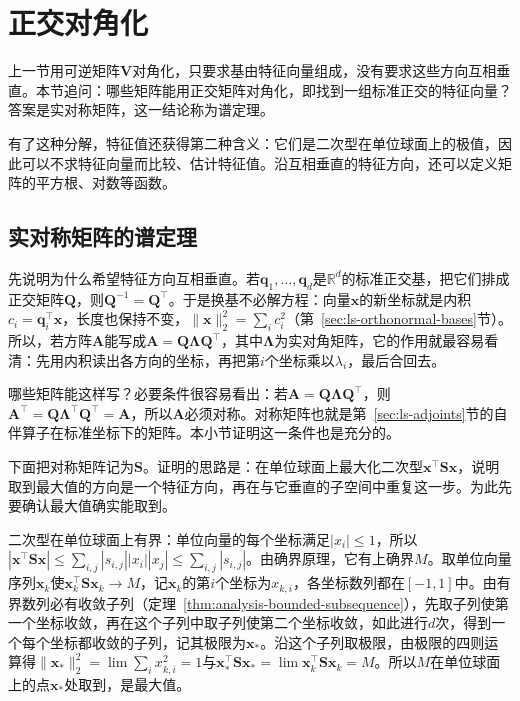 
\section{正交对角化}
\label{sec:ls-spectral-theory}

上一节用可逆矩阵$\bm V$对角化，只要求基由特征向量组成，没有要求这些方向互相垂直。本节追问：哪些矩阵能用正交矩阵对角化，即找到一组标准正交的特征向量？答案是实对称矩阵，这一结论称为谱定理。

有了这种分解，特征值还获得第二种含义：它们是二次型在单位球面上的极值，因此可以不求特征向量而比较、估计特征值。沿互相垂直的特征方向，还可以定义矩阵的平方根、对数等函数。

\subsection{实对称矩阵的谱定理}
\label{sec:ls-symmetric-spectral-decomposition}

先说明为什么希望特征方向互相垂直。若$\bm q_1,\ldots,\bm q_d$是$\mathbb R^d$的标准正交基，把它们排成正交矩阵$\bm Q$，则$\bm Q^{-1}=\bm Q^\top$。于是换基不必解方程：向量$\bm x$的新坐标就是内积$c_i=\bm q_i^\top\bm x$，长度也保持不变，$\lVert\bm x\rVert_2^2=\sum_ic_i^2$（第~\ref{sec:ls-orthonormal-bases}节）。所以，若方阵$\bm A$能写成$\bm A=\bm Q\bm\Lambda\bm Q^\top$，其中$\bm\Lambda$为实对角矩阵，它的作用就最容易看清：先用内积读出各方向的坐标，再把第$i$个坐标乘以$\lambda_i$，最后合回去。

哪些矩阵能这样写？必要条件很容易看出：若$\bm A=\bm Q\bm\Lambda\bm Q^\top$，则$\bm A^\top=\bm Q\bm\Lambda^\top\bm Q^\top=\bm A$，所以$\bm A$必须对称。对称矩阵也就是第~\ref{sec:ls-adjoints}节的自伴算子在标准坐标下的矩阵。本小节证明这一条件也是充分的。

下面把对称矩阵记为$\bm S$。证明的思路是：在单位球面上最大化二次型$\bm x^\top\bm S\bm x$，说明取到最大值的方向是一个特征方向，再在与它垂直的子空间中重复这一步。为此先要确认最大值确实能取到。

二次型在单位球面上有界：单位向量的每个坐标满足$|x_i|\leq1$，所以$|\bm x^\top\bm S\bm x|\leq\sum_{i,j}|s_{i,j}||x_i||x_j|\leq\sum_{i,j}|s_{i,j}|$。由确界原理，它有上确界$M$。取单位向量序列$\bm x_k$使$\bm x_k^\top\bm S\bm x_k\to M$，记$\bm x_k$的第$i$个坐标为$x_{k,i}$，各坐标数列都在$[-1,1]$中。由有界数列必有收敛子列（定理~\ref{thm:analysis-bounded-subsequence}），先取子列使第一个坐标收敛，再在这个子列中取子列使第二个坐标收敛，如此进行$d$次，得到一个每个坐标都收敛的子列，记其极限为$\bm x_*$。沿这个子列取极限，由极限的四则运算得$\lVert\bm x_*\rVert_2^2=\lim\sum_ix_{k,i}^2=1$与$\bm x_*^\top\bm S\bm x_*=\lim\bm x_k^\top\bm S\bm x_k=M$。所以$M$在单位球面上的点$\bm x_*$处取到，是最大值。


